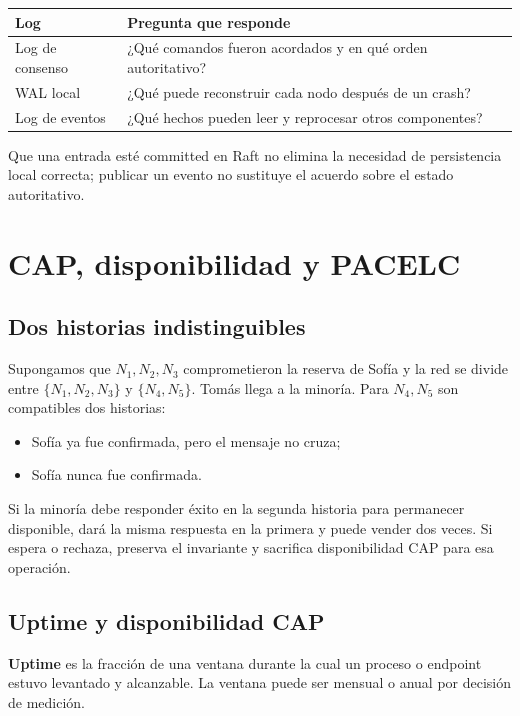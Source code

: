 \documentclass[variant=apuntes,cover=institutional,mode=screen]{ua-engineering-v6-article}
\begin{document}
\begin{center}
\begin{tabular}{p{}p{}}
\toprule
\textbf{Log} & \textbf{Pregunta que responde}\\
\midrule
Log de consenso & ¿Qué comandos fueron acordados y en qué orden autoritativo?\\
WAL local & ¿Qué puede reconstruir cada nodo después de un crash?\\
Log de eventos & ¿Qué hechos pueden leer y reprocesar otros componentes?\\
\bottomrule
\end{tabular}
\end{center}

Que una entrada esté committed en Raft no elimina la necesidad de persistencia local correcta; publicar un evento no sustituye el acuerdo sobre el estado autoritativo.

\section{CAP, disponibilidad y PACELC}

\subsection{Dos historias indistinguibles}

Supongamos que \(N_1,N_2,N_3\) comprometieron la reserva de Sofía y la red se divide entre \(\{N_1,N_2,N_3\}\) y \(\{N_4,N_5\}\). Tomás llega a la minoría. Para \(N_4,N_5\) son compatibles dos historias:

\begin{itemize}
\item Sofía ya fue confirmada, pero el mensaje no cruza;
\item Sofía nunca fue confirmada.
\end{itemize}

Si la minoría debe responder éxito en la segunda historia para permanecer disponible, dará la misma respuesta en la primera y puede vender dos veces. Si espera o rechaza, preserva el invariante y sacrifica disponibilidad CAP para esa operación.

\subsection{Uptime y disponibilidad CAP}

\textbf{Uptime} es la fracción de una ventana durante la cual un proceso o endpoint estuvo levantado y alcanzable. La ventana puede ser mensual o anual por decisión de medición.
\end{document}
